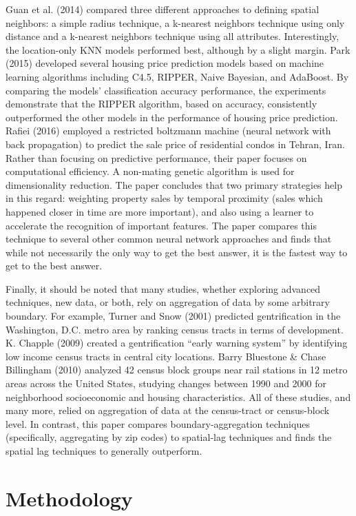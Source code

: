 \documentclass[12pt,]{article}
\begin{document}
Guan et al. (2014) compared three different approaches to defining
spatial neighbors: a simple radius technique, a k-nearest neighbors
technique using only distance and a k-nearest neighbors technique using
all attributes. Interestingly, the location-only KNN models performed
best, although by a slight margin. Park (2015) developed several housing
price prediction models based on machine learning algorithms including
C4.5, RIPPER, Naive Bayesian, and AdaBoost. By comparing the models'
classification accuracy performance, the experiments demonstrate that
the RIPPER algorithm, based on accuracy, consistently outperformed the
other models in the performance of housing price prediction. Rafiei
(2016) employed a restricted boltzmann machine (neural network with back
propagation) to predict the sale price of residential condos in Tehran,
Iran. Rather than focusing on predictive performance, their paper
focuses on computational efficiency. A non-mating genetic algorithm is
used for dimensionality reduction. The paper concludes that two primary
strategies help in this regard: weighting property sales by temporal
proximity (sales which happened closer in time are more important), and
also using a learner to accelerate the recognition of important
features. The paper compares this technique to several other common
neural network approaches and finds that while not necessarily the only
way to get the best answer, it is the fastest way to get to the best
answer.

Finally, it should be noted that many studies, whether exploring
advanced techniques, new data, or both, rely on aggregation of data by
some arbitrary boundary. For example, Turner and Snow (2001) predicted
gentrification in the Washington, D.C. metro area by ranking census
tracts in terms of development. K. Chapple (2009) created a
gentrification ``early warning system'' by identifying low income census
tracts in central city locations. Barry Bluestone \& Chase Billingham
(2010) analyzed 42 census block groups near rail stations in 12 metro
areas across the United States, studying changes between 1990 and 2000
for neighborhood socioeconomic and housing characteristics. All of these
studies, and many more, relied on aggregation of data at the
census-tract or census-block level. In contrast, this paper compares
boundary-aggregation techniques (specifically, aggregating by zip codes)
to spatial-lag techniques and finds the spatial lag techniques to
generally outperform.

\section{Methodology}\label{methodology}
\end{document}

